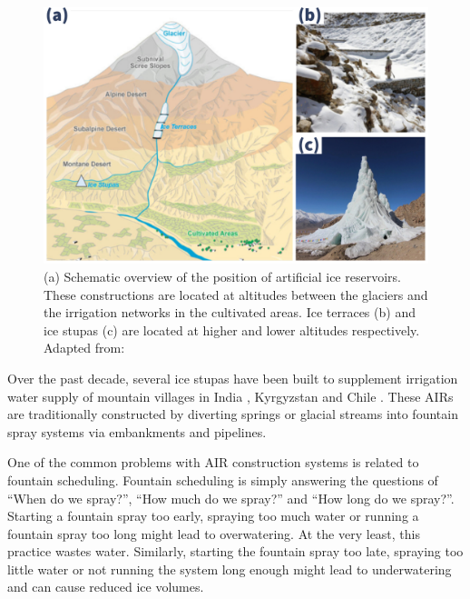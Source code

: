 \documentclass[tc, manuscript]{copernicus}
\begin{document}
\begin{figure}[htb]
\includegraphics[width=12cm]{Figures/AIR_forms.jpg}

\caption{(a) Schematic overview of the position of artificial ice reservoirs. These constructions are located at
altitudes between the glaciers and the irrigation networks in the cultivated areas. Ice terraces (b) and ice
stupas (c) are located at higher and lower altitudes respectively. Adapted from:
\cite{nusserLocalKnowledgeGlobal2016}}

\label{fig:AIRforms}
\end{figure}

Over the past decade, several ice stupas have been built to supplement irrigation water supply of mountain
villages in India \citep{wangchukIceStupaCompetition2020, palmerStoringFrozenWater2022,
aggarwalAdaptationClimateChange2021}, Kyrgyzstan \citep{bbcnewsBrightArtificialGlacier2020} and Chile
\citep{reutersConservationistsChileAim2021}. These AIRs are traditionally constructed by diverting springs or
glacial streams into fountain spray systems via embankments and pipelines. 

One of the common problems with AIR construction systems is related to fountain scheduling. Fountain scheduling
is simply answering the questions of “When do we spray?”, “How much do we spray?” and “How long do we spray?”.
Starting a fountain spray too early, spraying too much water or running a fountain spray too long might lead to
overwatering. At the very least, this practice wastes water.  Similarly, starting the fountain spray too late,
spraying too little water or not running the system long enough might lead to underwatering and can cause
reduced ice volumes.
\end{document}
